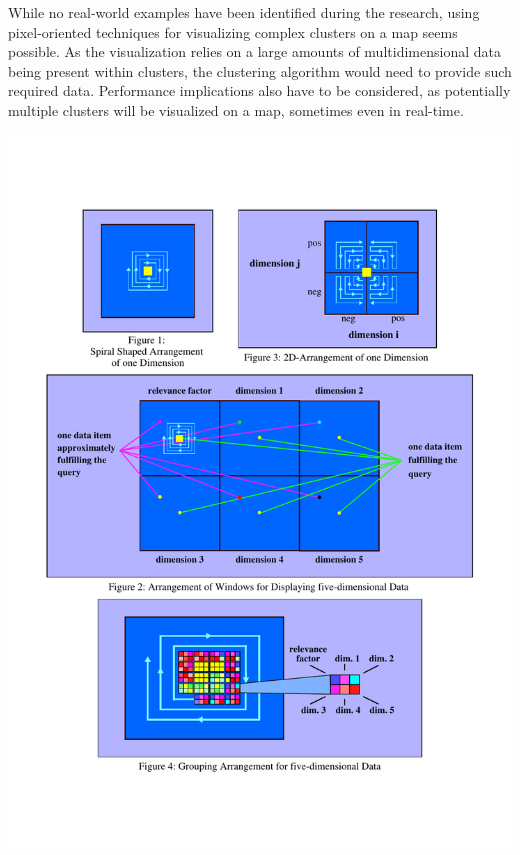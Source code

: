 \begin{itemize}
While no real-world examples have been identified during the research, using pixel-oriented techniques for visualizing complex clusters on a map seems possible. As the visualization relies on a large amounts of multidimensional data being present within clusters, the clustering algorithm would need to provide such required data. Performance implications also have to be considered, as potentially multiple clusters will be visualized on a map, sometimes even in real-time.

\hspace*{-2cm}\parbox [h]{0.35\textwidth }{
    \includegraphics [width=\linewidth]{figures/pixel_keim_spiral.pdf}
    \label{fig:pixel-spiral}
}
\hfill
\parbox [h]{0.33\textwidth }{
}
\end{itemize}
